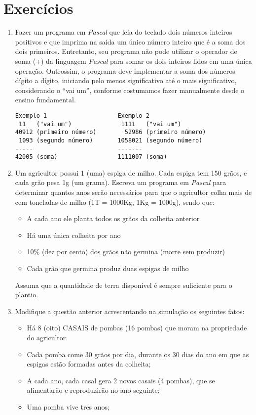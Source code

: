\section{Exercícios}


\begin{enumerate}

\item Fazer um programa em \emph{Pascal} que leia do teclado dois números inteiros positivos e que imprima na saída um único número inteiro
que é a soma dos dois primeiros. Entretanto, seu programa não pode utilizar o operador de soma (+) da linguagem \emph{Pascal} para somar os dois inteiros lidos em uma única operação. Outrossim, o programa deve implementar a soma dos números dígito a dígito, iniciando pelo menos significativo até o mais significativo, considerando o ``vai um'', conforme costumamos
fazer manualmente desde o ensino fundamental.

\begin{verbatim}
Exemplo 1                    Exemplo 2
 11   ("vai um")              1111   ("vai um")
40912 (primeiro número)        52986 (primeiro número)
 1093 (segundo número)       1058021 (segundo número)
-----                        -------
42005 (soma)                 1111007 (soma)
\end{verbatim}

\item Um agricultor possui 1 (uma) espiga de milho. Cada espiga tem 150 grãos,
e cada grão pesa 1g (um grama). Escreva um programa em \emph{Pascal} para
determinar quantos anos serão necessários para que o agricultor colha
mais de cem toneladas de milho (1T = 1000Kg, 1Kg = 1000g), sendo que:

\begin{itemize}
\item A cada ano ele planta todos os grãos da colheita anterior
\item Há uma única colheita por ano
\item 10\% (dez por cento) dos grãos não germina (morre sem produzir)
\item Cada grão que germina produz duas espigas de milho
\end{itemize}

Assuma que a quantidade de terra disponível é sempre suficiente para o
plantio.

\item Modifique a questão anterior acrescentando na simulação os seguintes fatos:

\begin{itemize}
\item  Há 8 (oito) CASAIS de pombas (16 pombas) que moram na propriedade
       do agricultor.
\item Cada pomba come 30 grãos por dia, durante os 30 dias do ano em que
as espigas estão formadas antes da colheita;
\item A cada ano, cada casal gera 2 novos casais (4 pombas), que se
alimentarão e reproduzirão no ano seguinte;
\item Uma pomba vive tres anos;
\end{itemize}


\end{enumerate}
